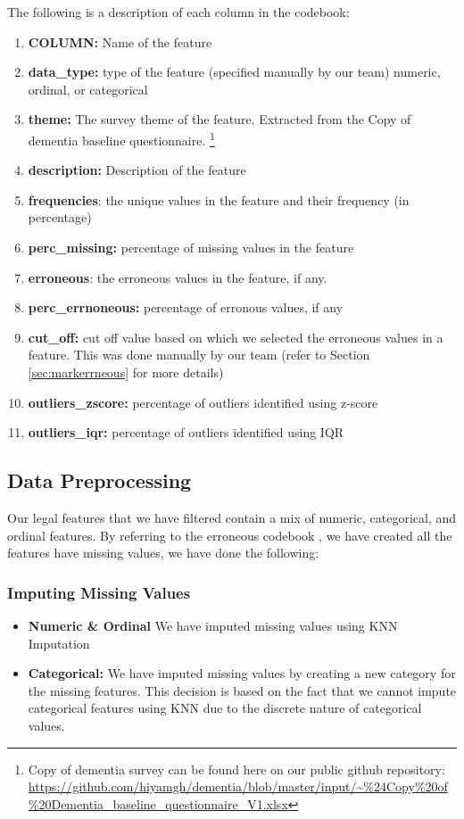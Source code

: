 \documentclass{article}
\begin{document}
The following is a description of each column in the codebook:
\begin{enumerate}
\item \textbf{COLUMN:} Name of the feature
\item \textbf{data\_type:} type of the feature (specified manually by our team) numeric, ordinal, or categorical
\item \textbf{theme:} The survey theme of the feature. Extracted from the Copy of dementia baseline questionnaire. \footnote{Copy of dementia survey can be found here on our public github repository: \url{https://github.com/hiyamgh/dementia/blob/master/input/~\%24Copy\%20of\%20Dementia_baseline_questionnaire_V1.xlsx}\label{copyof_codebook}}
\item \textbf{description:} Description of the feature
\item \textbf{frequencies}: the unique values in the feature and their frequency (in percentage)
\item \textbf{perc\_missing:} percentage of missing values in the feature
\item \textbf{erroneous}: the erroneous values in the feature, if any.
\item \textbf{perc\_errnoneous:} percentage of erronous values, if any
\item \textbf{cut\_off:} cut off value based on which we selected the erroneous values in a feature. This was done manually by our team (refer to Section \ref{sec:markerrneous} for more details)
\item \textbf{outliers\_zscore:} percentage of outliers identified using z-score
\item \textbf{outliers\_iqr:} percentage of outliers identified using IQR 
\end{enumerate}

\newpage
\subsection{Data Preprocessing}
Our legal features that we have filtered contain a mix of numeric, categorical, and ordinal features. By referring to the erroneous codebook , we have created all the features have missing values, we have done the following:


\subsubsection{Imputing Missing Values}
\begin{itemize}
\item \textbf{Numeric \& Ordinal} We have imputed missing values using KNN Imputation
\item \textbf{Categorical:} We have imputed missing values by creating a new category for the missing features. This decision is based on the fact that we cannot impute categorical features using KNN due to the discrete nature of categorical values.
\end{itemize}
\end{document}
